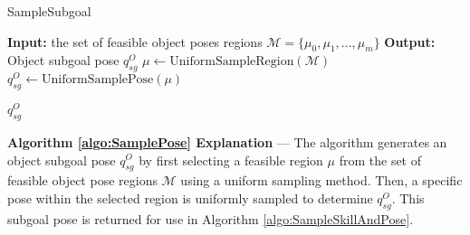
\begin{algorithm}[H]
\caption{SampleSubgoal}\label{algo:SamplePose}
\begin{algorithmic}[1]
\State \textbf{Input:} the set of feasible object poses regions $\mathcal{M} = \{\mu_0, \mu_1, ..., \mu_m\}$
\State \textbf{Output:} Object subgoal pose $q^O_{sg}$
\State $\mu \gets \text{UniformSampleRegion}(\mathcal{M})$ 
\State $q^O_{sg} \gets \text{UniformSamplePose}(\mu)$ 

\State \Return $q^{O}_{sg}$
\end{algorithmic}
\end{algorithm}
\begin{flushleft}
\footnotesize
\textbf{Algorithm \ref{algo:SamplePose} Explanation} — The algorithm generates an object subgoal pose $q^O_{sg}$ by first selecting a feasible region $\mu$ from the set of feasible object pose regions $\mathcal{M}$ using a uniform sampling method. Then, a specific pose within the selected region is uniformly sampled to determine $q^O_{sg}$. This subgoal pose is returned for use in Algorithm \ref{algo:SampleSkillAndPose}.
\end{flushleft}